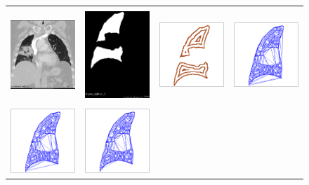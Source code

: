 \documentclass{llncs}
\begin{document}
\begin{figure}[t]
  \centering
  \begin{tabular}{cccc}
    \includegraphics[trim={5 160 340 110},clip,width=1.1in, height=1.4in]{figs/ct} &
    \includegraphics[trim={5 150 300 100},clip,width=1.1in, height=1.4in]{figs/pass} &
    \includegraphics[trim={150 100 150 100},clip,width=1.1in]{figs/points} &
    \includegraphics[trim={150 100 150 100},clip,width=1.1in]{figs/tris_200} \\
    \includegraphics[trim={150 100 150 100},clip,width=1.1in]{figs/tris_66} &
    \includegraphics[trim={150 100 150 100},clip,width=1.1in]{figs/tris_50} &

\end{tabular}
\end{figure}
\end{document}
